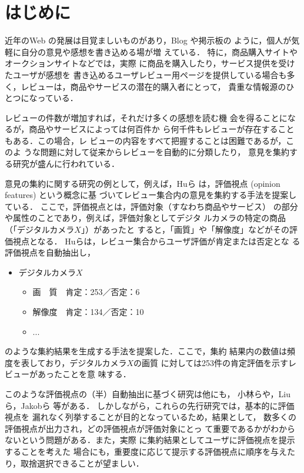 \documentclass[japanese]{jnlp_1.4}
\begin{document}
\maketitle


\section{はじめに}
\label{sec:intro}

近年のWeb の発展は目覚ましいものがあり，Blog や掲示板の
ように，個人が気軽に自分の意見や感想を書き込める場が増
えている．
特に，商品購入サイトやオークションサイトなどでは，実際
に商品を購入したり，サービス提供を受けたユーザが感想を
書き込めるユーザレビュー用ページを提供している場合も多
く，レビューは，商品やサービスの潜在的購入者にとって，
貴重な情報源のひとつになっている．

レビューの件数が増加すれば，それだけ多くの感想を読む機
会を得ることになるが，商品やサービスによっては何百件か
ら何千件もレビューが存在することもある．この場合，レ
ビューの内容をすべて把握することは困難であるが，このよ
うな問題に対して従来からレビューを自動的に分類したり，
意見を集約する研究が盛んに行われている\cite{sa2}．

意見の集約に関する研究の例として，例えば，Huら
\cite{hu}は，評価視点 (opinion features) という概念に基
づいてレビュー集合内の意見を集約する手法を提案している．
ここで，評価視点とは，評価対象（すなわち商品やサービス）
の部分や属性のことであり，例えば，評価対象としてデジタ
ルカメラの特定の商品（「デジタルカメラ$X$」）があったと
すると，「画質」や「解像度」などがその評価視点となる．
Huらは，レビュー集合からユーザ評価が肯定または否定とな
る評価視点を自動抽出し，
\begin{itemize}
 \item デジタルカメラ$X$
 \begin{itemize}
  \item 画　質　肯定：253／否定：6
  \item 解像度　肯定：134／否定：10
  \item ...
 \end{itemize}
\end{itemize}
のような集約結果を生成する手法を提案した．ここで，集約
結果内の数値は頻度を表しており，デジタルカメラ$X$の画質
に対しては253件の肯定評価を示すレビューがあったことを意
味する．

このような評価視点の（半）自動抽出に基づく研究は他にも，
小林ら\cite{kobayashi}や，Liuら\cite{liu}，Jakobら
  \cite{jakob}等がある．
しかしながら，これらの先行研究では，基本的に評価視点を
漏れなく列挙することが目的となっているため，結果として，
数多くの評価視点が出力され，どの評価視点が評価対象にとっ
て重要であるかがわからないという問題がある．また，実際
に集約結果としてユーザに評価視点を提示することを考えた
場合にも，重要度に応じて提示する評価視点に順序を与えた
り，取捨選択できることが望ましい．
\end{document}
